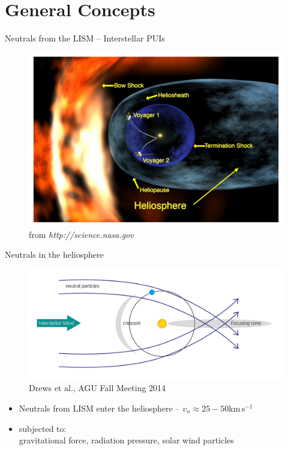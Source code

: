\documentclass{beamer}
\begin{document}
\section{General Concepts}
\begin{frame}{Neutrals from the LISM -- Interstellar PUIs}
	\begin{figure}
		\includegraphics[scale=0.35]{pictures/lism.png}
		\caption{\scriptsize{from \textit{http://science.nasa.gov}}}
	\end{figure}
\end{frame}
\begin{frame}{Neutrals in the heliosphere}
\begin{figure}
	\includegraphics[scale=0.2]{pictures/i_processes_0.png}
	\caption{\tiny{Drews et al., AGU Fall Meeting 2014}}
\end{figure}
\begin{itemize}
	\item Neutrals from LISM enter the heliosphere -- $v_n \approx 25 - 50 \mathrm{km\,s^{-1}}$
	\item subjected to: \\gravitational force, radiation pressure, solar wind particles
\end{itemize}
\end{frame}
\end{document}
